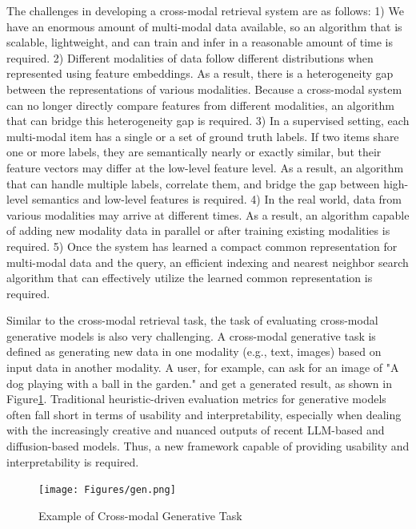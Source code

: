 The challenges in developing a cross-modal retrieval system are as follows: 1) We have an enormous amount of multi-modal data available, so an algorithm that is scalable, lightweight, and can train and infer in a reasonable amount of time is required. 2) Different modalities of data follow different distributions when represented using feature embeddings. As a result, there is a heterogeneity gap between the representations of various modalities. Because a cross-modal system can no longer directly compare features from different modalities, an algorithm that can bridge this heterogeneity gap is required. 3) In a supervised setting, each multi-modal item has a single or a set of ground truth labels. If two items share one or more labels, they are semantically nearly or exactly similar, but their feature vectors may differ at the low-level feature level. As a result, an algorithm that can handle multiple labels, correlate them, and bridge the gap between high-level semantics and low-level features is required. 4) In the real world, data from various modalities may arrive at different times. As a result, an algorithm capable of adding new modality data in parallel or after training existing modalities is required. 5) Once the system has learned a compact common representation for multi-modal data and the query, an efficient indexing and nearest neighbor search algorithm that can effectively utilize the learned common representation is required. 

Similar to the cross-modal retrieval task, the task of evaluating cross-modal generative models is also very challenging. A cross-modal generative task is defined as generating new data in one modality (e.g., text, images) based on input data in another modality. A user, for example, can ask for an image of "A dog playing with a ball in the garden." and get a generated result, as shown in Figure\ref{fig:gen}. Traditional heuristic-driven evaluation metrics for generative models often fall short in terms of usability and interpretability, especially when dealing with the increasingly creative and nuanced outputs of recent LLM-based and diffusion-based models. Thus, a new framework capable of providing usability and interpretability is required. 

\begin{figure}[h]
    \centering
    \texttt{[image: Figures/gen.png]}
    \caption{Example of Cross-modal Generative Task}
    \label{fig:gen}
\end{figure}

